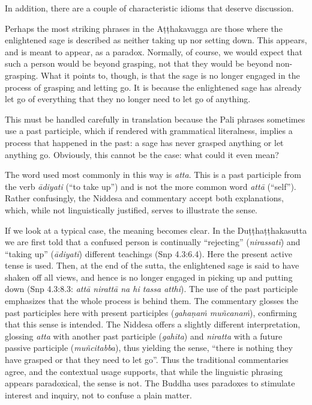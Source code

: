 \documentclass[12pt,openany]{book}%
\begin{document}
In addition, there are a couple of characteristic idioms that deserve discussion.

Perhaps the most striking phrases in the \textsanskrit{Aṭṭhakavagga} are those where the enlightened sage is described as neither taking up nor setting down. This appears, and is meant to appear, as a paradox. Normally, of course, we would expect that such a person would be beyond grasping, not that they would be beyond non-grasping. What it points to, though, is that the sage is no longer engaged in the process of grasping and letting go. It is because the enlightened sage has already let go of everything that they no longer need to let go of anything.

This must be handled carefully in translation because the Pali phrases sometimes use a past participle, which if rendered with grammatical literalness, implies a process that happened in the past: a sage has never grasped anything or let anything go. Obviously, this cannot be the case: what could it even mean?

The word used most commonly in this way is \textit{atta}. This is a past participle from the verb \textit{\textsanskrit{ādiyati}} (“to take up”) and is not the more common word \textit{\textsanskrit{attā}} (“self”). Rather confusingly, the Niddesa and commentary accept both explanations, which, while not linguistically justified, serves to illustrate the sense.

If we look at a typical case, the meaning becomes clear. In the \textsanskrit{Duṭṭhaṭṭhakasutta} we are first told that a confused person is continually “rejecting” (\textit{\textsanskrit{nirassatī}}) and “taking up” (\textit{\textsanskrit{ādiyatī}}) different teachings (Snp 4.3:6.4). Here the present active tense is used. Then, at the end of the sutta, the enlightened sage is said to have shaken off all views, and hence is no longer engaged in picking up and putting down (Snp 4.3:8.3: \textit{\textsanskrit{attā} \textsanskrit{nirattā} na hi tassa atthi}). The use of the past participle emphasizes that the whole process is behind them. The commentary glosses the past participles here with present participles (\textit{\textsanskrit{gahaṇaṁ} \textsanskrit{muñcanaṁ}}), confirming that this sense is intended. The Niddesa offers a slightly different interpretation, glossing \textit{atta} with another past participle (\textit{gahita}) and \textit{niratta} with a future passive participle (\textit{\textsanskrit{muñcitabba}}), thus yielding the sense, “there is nothing they have grasped or that they need to let go”. Thus the traditional commentaries agree, and the contextual usage supports, that while the linguistic phrasing appears paradoxical, the sense is not. The Buddha uses paradoxes to stimulate interest and inquiry, not to confuse a plain matter.
\end{document}
